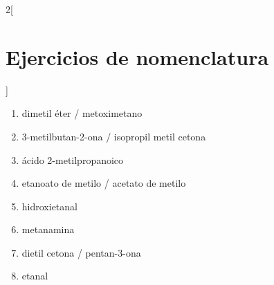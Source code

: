 \documentclass[10pt]{article}
\begin{document}
\begin{multicols}{2}[
  \section{Ejercicios de nomenclatura}
  ]
\begin{solution}
  \begin{enumerate}
    \item dimetil éter / metoximetano
    \item 3-metilbutan-2-ona / isopropil metil cetona
    \item ácido 2-metilpropanoico
    \item etanoato de metilo / acetato de metilo
    \item hidroxietanal
    \item metanamina
    \item dietil cetona / pentan-3-ona
    \item etanal
  \end{enumerate}
\end{solution}

\end{multicols}
\end{document}
